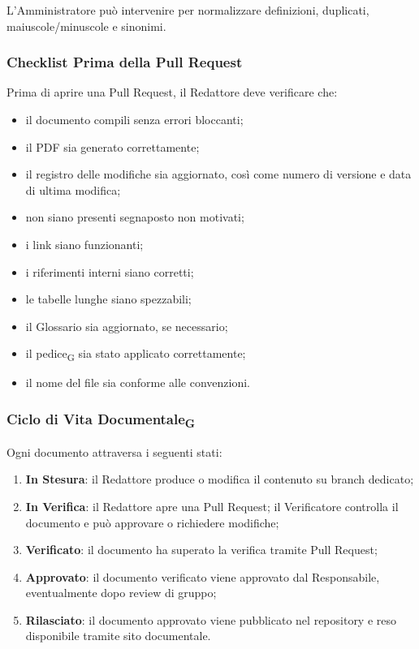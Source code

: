 L'Amministratore può intervenire per normalizzare definizioni, duplicati,
maiuscole/minuscole e sinonimi.


\subsubsection{Checklist Prima della Pull Request}

Prima di aprire una Pull Request, il Redattore deve verificare che:

\begin{itemize}
    \item il documento compili senza errori bloccanti;
    \item il PDF sia generato correttamente;
    \item il registro delle modifiche sia aggiornato, così come numero di versione e data di ultima modifica;
    \item non siano presenti segnaposto non motivati;
    \item i link siano funzionanti;
    \item i riferimenti interni siano corretti;
    \item le tabelle lunghe siano spezzabili;
    \item il Glossario sia aggiornato, se necessario;
    \item il pedice\textsubscript{G} sia stato applicato correttamente;
    \item il nome del file sia conforme alle convenzioni.
\end{itemize}


\subsubsection{Ciclo di Vita Documentale\textsubscript{G}}
\label{sec:ciclo-vita}

Ogni documento attraversa i seguenti stati:

\begin{enumerate}
    \item \textbf{In Stesura}: il Redattore produce o modifica il contenuto su branch
    dedicato;

    \item \textbf{In Verifica}: il Redattore apre una Pull Request; il Verificatore
    controlla il documento e può approvare o richiedere modifiche;

    \item \textbf{Verificato}: il documento ha superato la verifica tramite Pull Request;

    \item \textbf{Approvato}: il documento verificato viene approvato dal Responsabile,
    eventualmente dopo review di gruppo;

    \item \textbf{Rilasciato}: il documento approvato viene pubblicato nel repository
    e reso disponibile tramite sito documentale.
\end{enumerate}

